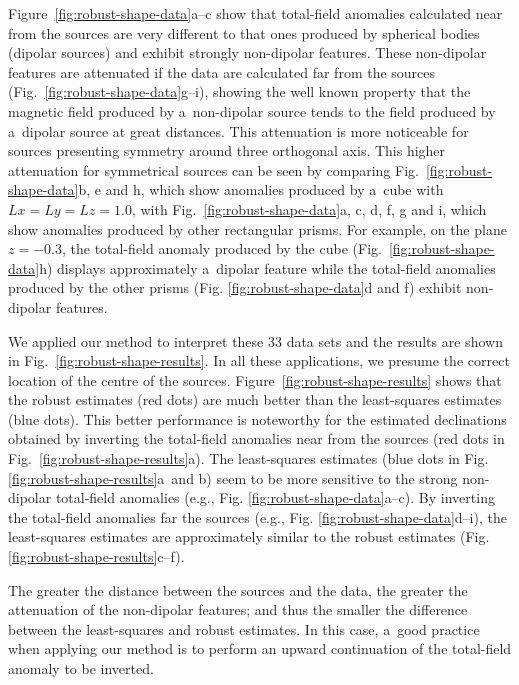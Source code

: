 \documentclass[journal abbreviation, npg]{copernicus}
\begin{document}
Figure~\ref{fig:robust-shape-data}a--c show that total-field anomalies
calculated near from the sources are very different to that ones
produced by spherical bodies (dipolar sources) and exhibit strongly
non-dipolar features. These non-dipolar features are attenuated if the
data are calculated far from the sources
(Fig.~\ref{fig:robust-shape-data}g--i), showing the well known
property that the magnetic field produced by a~non-dipolar source
tends to the field produced by a~dipolar source at great
distances. This attenuation is more noticeable for sources presenting
symmetry around three orthogonal axis. This higher attenuation for
symmetrical sources can be seen by comparing
Fig.~\ref{fig:robust-shape-data}b, e and h, which show anomalies
produced by a~cube with $Lx=Ly=Lz=1.0$, with
Fig.~\ref{fig:robust-shape-data}a, c, d, f, g and i, which show
anomalies produced by other rectangular prisms. For example, on the
plane $z=-0.3$, the total-field anomaly produced by the cube
(Fig.~\ref{fig:robust-shape-data}h) displays approximately a~dipolar
feature while the total-field anomalies produced by the other prisms
(Fig. \ref{fig:robust-shape-data}d and f) exhibit non-dipolar
features.

We applied our method to interpret these 33 data sets and the results
are shown in Fig.~\ref{fig:robust-shape-results}. In all these
applications, we presume the correct location of the centre of the
sources. Figure~\ref{fig:robust-shape-results} shows that the robust
estimates (red dots) are much better than the least-squares estimates
(blue dots). This better performance is noteworthy for the estimated
declinations obtained by inverting the total-field anomalies near from
the sources (red dots in Fig.~\ref{fig:robust-shape-results}a). The
least-squares estimates (blue dots in
Fig. \ref{fig:robust-shape-results}a~and b) seem to be more sensitive
to the strong non-dipolar total-field anomalies (e.g.,
Fig. \ref{fig:robust-shape-data}a--c). By inverting the total-field
anomalies far the sources (e.g.,
Fig. \ref{fig:robust-shape-data}d--i), the least-squares estimates are
approximately similar to the robust estimates
(Fig. \ref{fig:robust-shape-results}c--f).

The greater the distance between the sources and the data, the greater
the attenuation of the non-dipolar features; and thus the smaller the
difference between the least-squares and robust estimates. In this
case, a~good practice when applying our method is to perform an upward
continuation of the total-field anomaly to be inverted.
\end{document}
